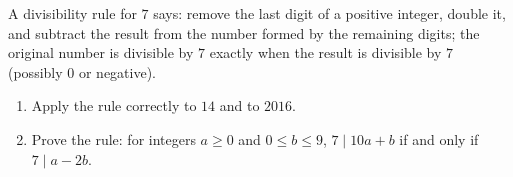 A divisibility rule for $7$ says: remove the last digit of a positive integer, double it, and subtract the result from the number formed by the remaining digits; the original number is divisible by $7$ exactly when the result is divisible by $7$ (possibly $0$ or negative).
\begin{enumerate}
\item[(a)] Apply the rule correctly to $14$ and to $2016$.
\item[(b)] Prove the rule: for integers $a\ge0$ and $0\le b\le9$, $7\mid 10a+b$ if and only if $7\mid a-2b$.
\end{enumerate}
